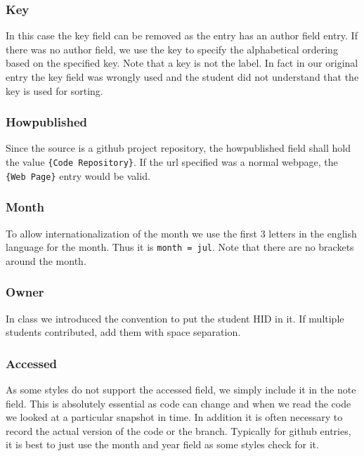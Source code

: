 \subsubsection{Key}\label{s:e:key}

In this case the key field can be removed as the entry has an author
field entry. If there was no author field, we use the key to specify
the alphabetical ordering based on the specified key. Note that a key is
not the label. In fact in our original entry the key field was wrongly
used and the student did not understand that the key is used for
sorting.

\subsubsection{Howpublished}\label{s:e:howpublished}

Since the source is a github project repository, the howpublished field
shall hold the value \verb|{Code Repository}|. If the
url specified was a normal webpage, the \verb|{Web Page}| entry would be
valid.

\subsubsection{Month}\label{s:e:month}

To allow internationalization of the month we use the first 3 letters
in the english language for the month. Thus it is 
\verb|month = jul|. Note that there are no brackets around the month.

\subsubsection{Owner}\label{s:e:owner}

In class we introduced the convention to put the student HID in it. If
multiple students contributed, add them with space separation.

\subsubsection{Accessed}\label{s:e:accessed}

As some styles do not support the accessed field, we simply include it in
the note field. This is absolutely essential as code can change and when
we read the code we looked at a particular snapshot in time. In addition
it is often necessary to record the actual version of the code or the branch.
Typically for github entries, it is best to just use the month and
year field as some styles check for it.

